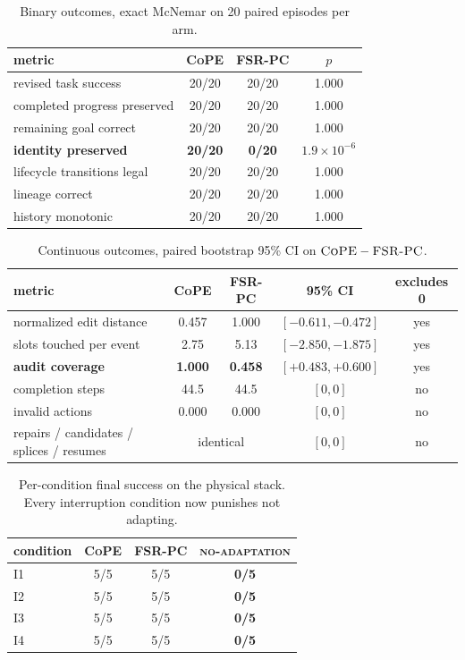 \documentclass[11pt]{article}
\newcommand{\cope}{\textsc{CoPE}}
\newcommand{\fsrpc}{\textsc{FSR-PC}}
\newcommand{\noadapt}{\textsc{no-adaptation}}
\begin{document}
\begin{table}[h]
\centering
\caption{Binary outcomes, exact McNemar on 20 paired episodes per arm.}
\begin{tabular}{@{}lccc@{}}
\toprule
metric & \cope{} & \fsrpc{} & $p$\\
\midrule
revised task success & 20/20 & 20/20 & 1.000\\
completed progress preserved & 20/20 & 20/20 & 1.000\\
remaining goal correct & 20/20 & 20/20 & 1.000\\
\textbf{identity preserved} & \textbf{20/20} & \textbf{0/20} & $1.9\times10^{-6}$\\
lifecycle transitions legal & 20/20 & 20/20 & 1.000\\
lineage correct & 20/20 & 20/20 & 1.000\\
history monotonic & 20/20 & 20/20 & 1.000\\
\bottomrule
\end{tabular}
\end{table}

\begin{table}[h]
\centering
\caption{Continuous outcomes, paired bootstrap 95\% CI on
$\text{\cope{}}-\text{\fsrpc{}}$.}
\begin{tabular}{@{}lcccc@{}}
\toprule
metric & \cope{} & \fsrpc{} & 95\% CI & excludes 0\\
\midrule
normalized edit distance & 0.457 & 1.000 & $[-0.611,-0.472]$ & yes\\
slots touched per event & 2.75 & 5.13 & $[-2.850,-1.875]$ & yes\\
\textbf{audit coverage} & \textbf{1.000} & \textbf{0.458} & $[+0.483,+0.600]$ & yes\\
completion steps & 44.5 & 44.5 & $[0,0]$ & no\\
invalid actions & 0.000 & 0.000 & $[0,0]$ & no\\
repairs / candidates / splices / resumes & \multicolumn{2}{c}{identical} & $[0,0]$ & no\\
\bottomrule
\end{tabular}
\end{table}

\begin{table}[h]
\centering
\caption{Per-condition final success on the physical stack. Every interruption
condition now punishes not adapting.}
\begin{tabular}{@{}lccc@{}}
\toprule
condition & \cope{} & \fsrpc{} & \noadapt{}\\
\midrule
I1 & 5/5 & 5/5 & \textbf{0/5}\\
I2 & 5/5 & 5/5 & \textbf{0/5}\\
I3 & 5/5 & 5/5 & \textbf{0/5}\\
I4 & 5/5 & 5/5 & \textbf{0/5}\\
\bottomrule
\end{tabular}
\end{table}
\end{document}
